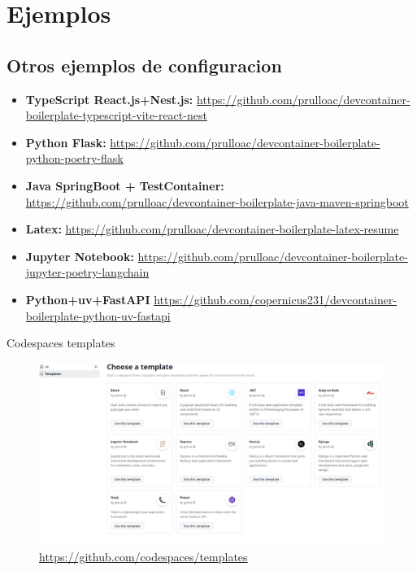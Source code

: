 \documentclass{beamer}
\begin{document}
\section{Ejemplos}
\subsection{Otros ejemplos de configuracion}
\begin{frame}{\subsecname}
  \begin{itemize}
    \small
    \item \textbf{TypeScript React.js+Nest.js:} \href{https://github.com/prulloac/devcontainer-boilerplate-typescript-vite-react-nest}{https://github.com/prulloac/devcontainer-boilerplate-typescript-vite-react-nest}
    \item \textbf{Python Flask:} \href{https://github.com/prulloac/devcontainer-boilerplate-python-poetry-flask}{https://github.com/prulloac/devcontainer-boilerplate-python-poetry-flask}
    \item \textbf{Java SpringBoot + TestContainer:} \href{https://github.com/prulloac/devcontainer-boilerplate-java-maven-springboot}{https://github.com/prulloac/devcontainer-boilerplate-java-maven-springboot}
    \item \textbf{Latex:} \href{https://github.com/prulloac/devcontainer-boilerplate-latex-resume}{https://github.com/prulloac/devcontainer-boilerplate-latex-resume}
    \item \textbf{Jupyter Notebook:} \href{https://github.com/prulloac/devcontainer-boilerplate-jupyter-poetry-langchain}{https://github.com/prulloac/devcontainer-boilerplate-jupyter-poetry-langchain}
    \item \textbf{Python+uv+FastAPI} \href{https://github.com/copernicus231/devcontainer-boilerplate-python-uv-fastapi}{https://github.com/copernicus231/devcontainer-boilerplate-python-uv-fastapi}
    \normalsize
  \end{itemize}
\end{frame}
\begin{frame}{Codespaces templates}
  \begin{figure}
    \centering
    \includegraphics[width=\textwidth]{images/codespaces-templates.png}
    \caption{\href{https://github.com/codespaces/templates}{https://github.com/codespaces/templates}}
  \end{figure}
\end{frame}
\end{document}
